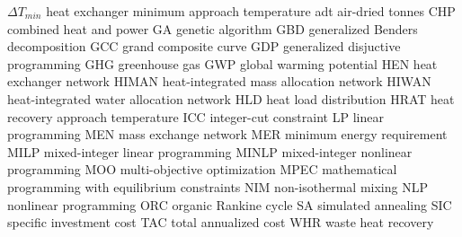 \newcommand\conclimits[1]{\textcolor{black}{\textbf{#1}}}
\newcommand{\sqrfinal}{\textcolor{teal}{$\blacksquare$}} %
\newcommand{\setfont}[2]{{\fontfamily{#1}\selectfont #2}}
   {$\Delta T_{min}$}  {heat exchanger minimum approach temperature}
    {adt}   {air-dried tonnes}
    {CHP}   {combined heat and power}
     {GA}    {genetic algorithm}
    {GBD}   {generalized Benders decomposition}
    {GCC}   {grand composite curve}
    {GDP}   {generalized disjuctive programming}
    {GHG}   {greenhouse gas}
    {GWP}   {global warming potential}
    {HEN}   {heat exchanger network}
  {HIMAN} {heat-integrated mass allocation network}
  {HIWAN} {heat-integrated water allocation network}
    {HLD}   {heat load distribution}
   {HRAT}  {heat recovery approach temperature}
    {ICC}   {integer-cut constraint}
     {LP}    {linear programming}
    {MEN}   {mass exchange network}
    {MER}   {minimum energy requirement}
   {MILP}  {mixed-integer linear programming}
  {MINLP} {mixed-integer nonlinear programming}
    {MOO}   {multi-objective optimization}
   {MPEC}  {mathematical programming with equilibrium constraints}
    {NIM}   {non-isothermal mixing}
    {NLP}   {nonlinear programming}
    {ORC}   {organic Rankine cycle}
     {SA}    {simulated annealing}
    {SIC}   {specific investment cost}
    {TAC}   {total annualized cost}
    {WHR}   {waste heat recovery}

\makeglossaries
\newcommand{\thesistitle}           {Methodologies for simultaneous optimization of heat, mass, and power in industrial processes}

